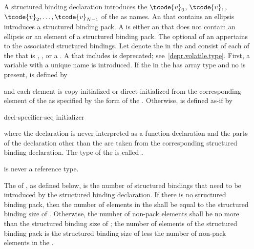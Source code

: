 \pnum
A structured binding declaration introduces the 
$\tcode{v}_0$, $\tcode{v}_1$, $\tcode{v}_2, \dotsc, \tcode{v}_{N-1}$
of the
 as names.
An  that contains an ellipsis
introduces a structured binding pack.
A  is either
an  that does not contain an ellipsis or
an element of a structured binding pack.
The optional  of
an 
appertains to the associated structured bindings.
Let \cv{} denote the  in
the  and
 consist of
each  of the 
that is , , or
a .
A \cv{} that includes  is deprecated;
see~\ref{depr.volatile.type}.
First, a variable with a unique name  is introduced. If the
 in the 
has array type   and no  is present,
 is defined by
\begin{ncbnf}
  \cv{}   \terminal{;}
\end{ncbnf}
and each element is copy-initialized or direct-initialized
from the corresponding element of the  as specified
by the form of the .
Otherwise, 
is defined as-if by
\begin{ncbnf}
 decl-specifier-seq   initializer \terminal{;}
\end{ncbnf}
where
the declaration is never interpreted as a function declaration and
the parts of the declaration other than the  are taken
from the corresponding structured binding declaration.
The type of the 
 is called .
\begin{note}
 is never a reference type.
\end{note}

\pnum
The  of , as defined below,
is the number of structured bindings
that need to be introduced by the structured binding declaration.
If there is no structured binding pack,
then the number of elements in the 
shall be equal to the structured binding size of .
Otherwise, the number of non-pack elements shall be no more than
the structured binding size of ;
the number of elements of the structured binding pack is
the structured binding size of  less
the number of non-pack elements in the .

